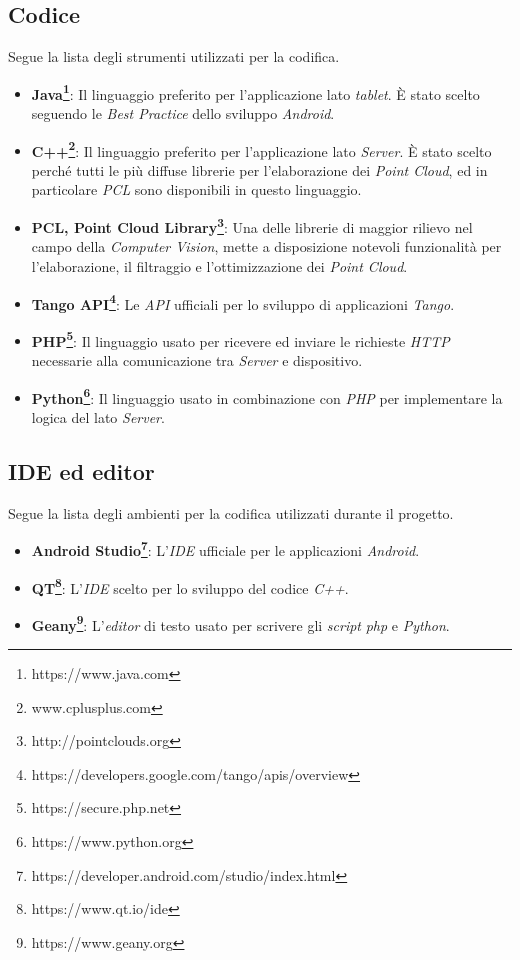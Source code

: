 \subsection{Codice}
Segue la lista degli strumenti utilizzati per la codifica.
\begin{itemize}
	\item \textbf{Java\footnote{https://www.java.com}}: Il linguaggio preferito per l'applicazione lato \emph{tablet}. È stato scelto seguendo le \emph{Best Practice} dello sviluppo \emph{Android}.
	\item \textbf{C++\footnote{www.cplusplus.com}}: Il linguaggio preferito per l'applicazione lato \emph{Server}. È stato scelto perché tutti le più diffuse librerie per l'elaborazione dei \emph{Point Cloud}, ed in particolare \emph{PCL} sono disponibili in questo linguaggio.
	\item \textbf{PCL, Point Cloud Library\footnote{http://pointclouds.org}}: Una delle librerie di maggior rilievo nel campo della \emph{Computer Vision}, mette a disposizione notevoli funzionalità per l'elaborazione, il filtraggio e l'ottimizzazione dei \emph{Point Cloud}.
	\item \textbf{Tango API\footnote{https://developers.google.com/tango/apis/overview}}: Le \emph{API} ufficiali per lo sviluppo di applicazioni \emph{Tango}.
	\item \textbf{PHP\footnote{https://secure.php.net}}: Il linguaggio usato per ricevere ed inviare le richieste \emph{HTTP} necessarie alla comunicazione tra \emph{Server} e dispositivo.
	\item \textbf{Python\footnote{https://www.python.org}}: Il linguaggio usato in combinazione con \emph{PHP} per implementare la logica del lato \emph{Server}.
\end{itemize}

\newpage
\subsection{IDE ed editor}
Segue la lista degli ambienti per la codifica utilizzati durante il progetto.
\begin{itemize}
	\item \textbf{Android Studio\footnote{https://developer.android.com/studio/index.html}}: L'\emph{IDE} ufficiale per le applicazioni \emph{Android}.
	\item \textbf{QT\footnote{https://www.qt.io/ide}}: L'\emph{IDE} scelto per lo sviluppo del codice \emph{C++}.
	\item \textbf{Geany\footnote{https://www.geany.org}}: L'\emph{editor} di testo usato per scrivere gli \emph{script} \emph{php} e \emph{Python}.
\end{itemize}

